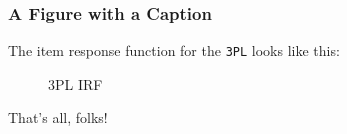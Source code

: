 \documentclass{beamer}
\begin{document}
\begin{frame}[fragile]
\frametitle{A Figure with a Caption}
The item response function for the \verb|3PL| looks like this:

\begin{figure}
\caption{3PL IRF}
\end{figure}
\end{frame}

\begin{frame}
That's all, folks!
\end{frame}
\end{document}

